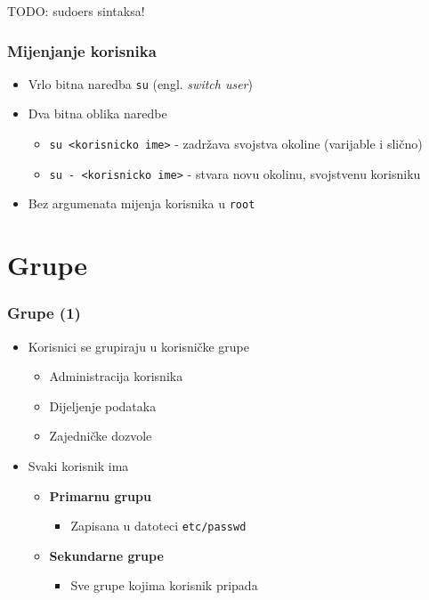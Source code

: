 \documentclass[table,usenames,dvipsnames] {beamer}
\newcommand{\shell}[1]{\texttt{#1}}
\begin{document}
\begin{frame}
  \Huge{TODO: sudoers sintaksa!}
\end{frame}

\begin{frame}[t]
\frametitle{Mijenjanje korisnika} 
\begin{itemize}
  \item Vrlo bitna naredba \shell{su} (engl. \emph{switch user})
  \item Dva bitna oblika naredbe
  \begin{itemize}
    \item \shell{su <korisnicko ime>} - zadržava svojstva okoline (varijable i slično)
    \item \shell{su - <korisnicko ime>} - stvara novu okolinu, svojstvenu korisniku
  \end{itemize}
  \item Bez argumenata mijenja korisnika u \shell{root}
\end{itemize}
\end{frame}

\section{Grupe}
\begin{frame}[t]
\frametitle{Grupe (1)}
\begin{itemize}
  \item Korisnici se grupiraju u korisničke grupe
  \begin{itemize}
  	\item Administracija korisnika
  	\item Dijeljenje podataka
  	\item Zajedničke dozvole
  \end{itemize}
  \item Svaki korisnik ima
  \begin{itemize}
    \item[] \textbf{Primarnu grupu}
    \begin{itemize}
      \item Zapisana u datoteci \shell{etc/passwd} 
    \end{itemize}
    \item[] \textbf{Sekundarne grupe}
    \begin{itemize}
      \item  Sve grupe kojima korisnik pripada
    \end{itemize}
  \end{itemize}
\end{itemize}
\end{frame}
\end{document}
